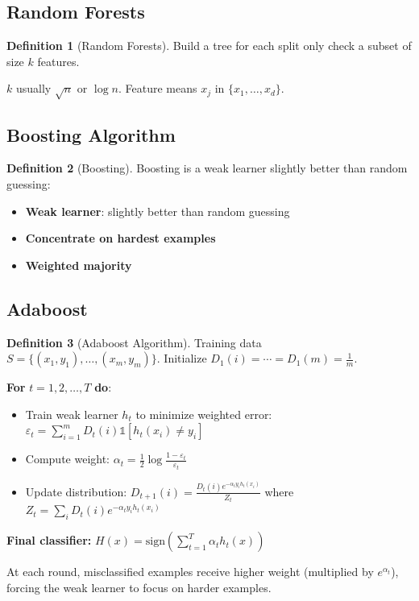 \documentclass[12pt,a4paper]{article}
\theoremstyle{definition}
\newtheorem{definition}{Definition}[section]
\begin{document}
\subsection{Random Forests}

\begin{definition}[Random Forests]
Build a tree for each split only check a subset of size $k$ features.

$k$ usually $\sqrt{n}$ or $\log n$. Feature means $x_j$ in $\{x_1, \ldots, x_d\}$.
\end{definition}

\subsection{Boosting Algorithm}

\begin{definition}[Boosting]
Boosting is a weak learner slightly better than random guessing:

\begin{itemize}
    \item \textbf{Weak learner}: slightly better than random guessing
    \item \textbf{Concentrate on hardest examples}
    \item \textbf{Weighted majority}
\end{itemize}
\end{definition}

\subsection{Adaboost}

\begin{definition}[Adaboost Algorithm]
Training data $S = \{(x_1, y_1), \ldots, (x_m, y_m)\}$. Initialize $D_1(i) = \cdots = D_1(m) = \frac{1}{m}$.

\textbf{For } $t = 1, 2, \ldots, T$ \textbf{ do}:
\begin{itemize}
    \item Train weak learner $h_t$ to minimize weighted error: $\varepsilon_t = \sum_{i=1}^m D_t(i) \mathbb{1}[h_t(x_i) \neq y_i]$
    \item Compute weight: $\alpha_t = \frac{1}{2} \log \frac{1-\varepsilon_t}{\varepsilon_t}$
    \item Update distribution: $D_{t+1}(i) = \frac{D_t(i) e^{-\alpha_t y_i h_t(x_i)}}{Z_t}$ where $Z_t = \sum_i D_t(i) e^{-\alpha_t y_i h_t(x_i)}$
\end{itemize}

\textbf{Final classifier:} $H(x) = \text{sign}\left(\sum_{t=1}^T \alpha_t h_t(x)\right)$

At each round, misclassified examples receive higher weight (multiplied by $e^{\alpha_t}$), forcing the weak learner to focus on harder examples.
\end{definition}
\end{document}
